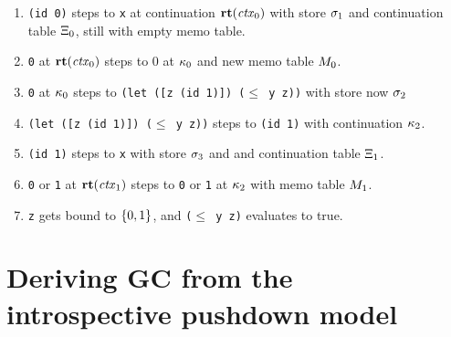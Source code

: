 \begin{enumerate}
\item{\texttt{(id 0)} steps to \texttt{x} at continuation $\mathbf{rt}(\mathit{ctx}_0)$ with store $\sigma_1$ and continuation table $\Xi_0$, still with empty memo table.}
\item{\texttt{0} at $\mathbf{rt}(\mathit{ctx}_0)$ steps to $0$ at $\kappa_0$ and new memo table $M_0$.}
\item{\texttt{0} at $\kappa_0$ steps to \texttt{(let ([z (id 1)]) ($\le$ y z))} with store now $\sigma_2$}
\item{\texttt{(let ([z (id 1)]) ($\le$ y z))} steps to \texttt{(id 1)} with continuation $\kappa_2$.}
\item{\texttt{(id 1)} steps to \texttt{x} with store $\sigma_3$ and and continuation table $\Xi_1$.}
\item{\texttt{0} or \texttt{1} at $\mathbf{rt}(\mathit{ctx}_1)$ steps to \texttt{0} or \texttt{1} at $\kappa_2$ with memo table $M_1$.}
\item{\texttt{z} gets bound to $\{ 0,1 \}$, and \texttt{($\le$ y z)} evaluates to true.}
\end{enumerate}

\iftr{}

\section{Deriving GC from the introspective pushdown model}\label{sec:gc}

